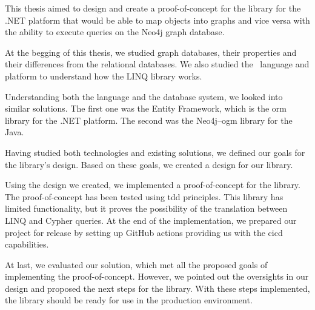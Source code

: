 \begin{conclusion}

    This thesis aimed to design and create a proof-of-concept for the library for the .NET platform that would be able to map objects into graphs and vice versa with the ability to execute queries on the Neo4j graph database.

    At the begging of this thesis, we studied graph databases, their properties and their differences from the relational databases.
    We also studied the \CS\ language and platform to understand how the LINQ library works.

    Understanding both the language and the database system, we looked into similar solutions. The first one was the Entity Framework, which is the \acrshort{orm} library for the .NET platform.
    The second was the Neo4j--\acrshort{ogm} library for the Java.

    Having studied both technologies and existing solutions, we defined our goals for the library's design.
    Based on these goals, we created a design for our library.

    Using the design we created, we implemented a proof-of-concept for the library.
    The proof-of-concept has been tested using \acrshort{tdd} principles.
    This library has limited functionality, but it proves the possibility of the translation between LINQ and Cypher queries.
    At the end of the implementation, we prepared our project for release by setting up GitHub actions providing us with the \acrshort{cicd} capabilities.

    \pagebreak

    At last, we evaluated our solution, which met all the proposed goals of implementing the proof-of-concept.
    However, we pointed out the oversights in our design and proposed the next steps for the library.
    With these steps implemented, the library should be ready for use in the production environment.


\end{conclusion}